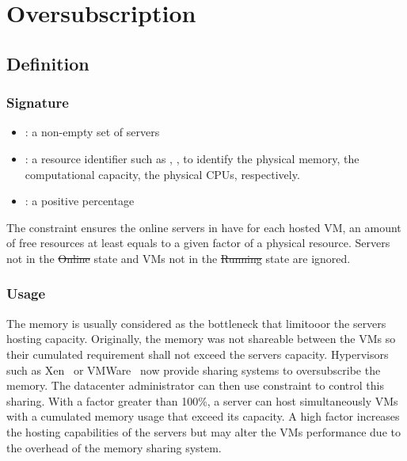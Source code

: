 \section{Oversubscription}

\subsection{Definition}

\subsubsection{Signature} 

\begin{itemize}
\item {} : a non-empty set of servers
\item {} : a resource identifier such as , ,  to identify the physical memory,
the computational capacity, the physical CPUs, respectively.
\item {} : a positive percentage
\end{itemize}

The  constraint ensures the online servers in  have for each hosted VM, 
an amount of free resources at least equals to a given factor of a physical resource.
Servers not in the \st{Online} state and VMs not in the \st{Running} state are ignored.


\subsubsection{Usage}

The memory is usually considered as the bottleneck that limitooor the servers hosting capacity.
Originally, the memory was not shareable between the VMs so their cumulated requirement shall not exceed the servers capacity. Hypervisors such as Xen~\cite{xen-memory-sharing} or VMWare~\cite{vmware-memory-sharing} now provide sharing systems to oversubscribe the memory. 
The datacenter administrator can then use  constraint to control this sharing. With a factor greater than 100\%,
a server can host simultaneously VMs with a cumulated memory usage that exceed its capacity. A high factor increases the hosting capabilities of the servers but may alter the VMs performance due to the overhead of the memory sharing system.

